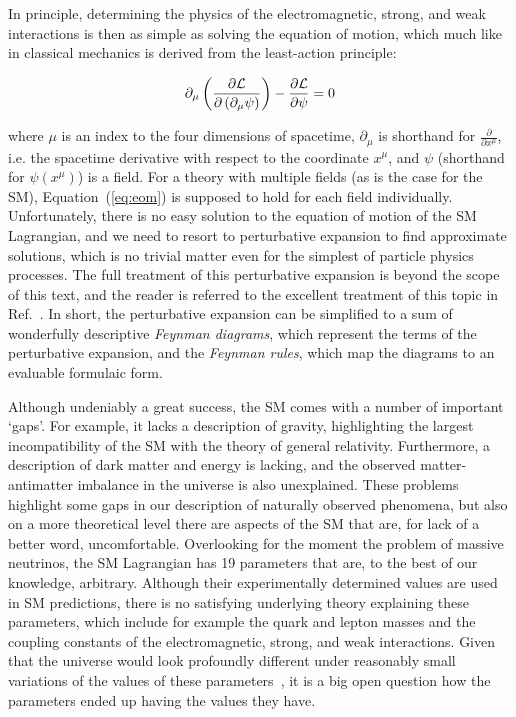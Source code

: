 In principle, determining the physics of the electromagnetic, strong, and weak interactions is then as simple as solving the equation of motion, which much like in classical mechanics is derived from the least-action principle:
% 
\begin{linenomath*}
\begin{equation}
\label{eq:eom}
\partial_\mu \left(
    \frac{
        \partial \mathcal{L}
        }{
        \partial \left( \partial_\mu \psi \right)
        }
    \right)
    -
    \frac{\partial\mathcal{L}}{\partial\psi}
    = 0
\end{equation}
\end{linenomath*}
% 
where $\mu$ is an index to the four dimensions of spacetime, $\partial_\mu$ is shorthand for $\frac{\partial}{\partial x^\mu}$, i.e. the spacetime derivative with respect to the coordinate $x^\mu$, and $\psi$ (shorthand for $\psi(x^\mu)$) is a field.
% 
For a theory with multiple fields (as is the case for the SM), Equation~(\ref{eq:eom}) is supposed to hold for each field individually.
% 
Unfortunately, there is no easy solution to the equation of motion of the SM Lagrangian, and we need to resort to perturbative expansion to find approximate solutions, which is no trivial matter even for the simplest of particle physics processes.
% 
The full treatment of this perturbative expansion is beyond the scope of this text, and the reader is referred to the excellent treatment of this topic in Ref.~\cite{peskin}.
% 
In short, the perturbative expansion can be simplified to a sum of wonderfully descriptive \textit{Feynman diagrams}, which represent the terms of the perturbative expansion, and the \textit{Feynman rules}, which map the diagrams to an evaluable formulaic form.


Although undeniably a great success, the SM comes with a number of important `gaps'.
% 
For example, it lacks a description of gravity, highlighting the largest incompatibility of the SM with the theory of general relativity.
% 
Furthermore, a description of dark matter and energy is lacking, and the observed matter-antimatter imbalance in the universe is also unexplained.
% 
These problems highlight some gaps in our description of naturally observed phenomena, but also on a more theoretical level there are aspects of the SM that are, for lack of a better word, uncomfortable.
% 
Overlooking for the moment the problem of massive neutrinos, the SM Lagrangian has 19 parameters that are, to the best of our knowledge, arbitrary.
% 
Although their experimentally determined values are used in SM predictions, there is no satisfying underlying theory explaining these parameters, which include for example the quark and lepton masses and the coupling constants of the electromagnetic, strong, and weak interactions.
% 
Given that the universe would look profoundly different under reasonably small variations of the values of these parameters~\cite{Cahn:1996ag}, it is a big open question how the parameters ended up having the values they have.
% 


